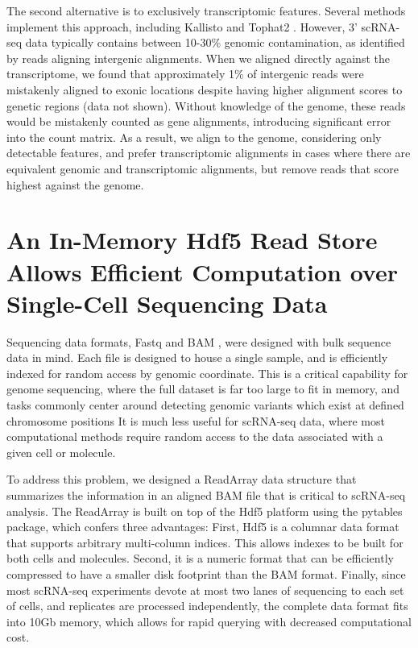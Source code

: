 The second alternative is to exclusively transcriptomic features. 
Several methods implement this approach, including Kallisto \citep{Bray2016} and Tophat2 \citep{Kim2013}. 
However, 3' scRNA-seq data typically contains between 10-30\% genomic contamination, as identified by reads aligning intergenic alignments. 
When we aligned directly against the transcriptome, we found that approximately 1\% of intergenic reads were mistakenly aligned to exonic locations despite having higher alignment scores to genetic regions (data not shown). 
Without knowledge of the genome, these reads would be mistakenly counted as gene alignments, introducing significant error into the count matrix. 
As a result, we align to the genome, considering only detectable features, and prefer transcriptomic alignments in cases where there are equivalent genomic and transcriptomic alignments, but remove reads that score highest against the genome.

\section{An In-Memory Hdf5 Read Store Allows Efficient Computation over Single-Cell Sequencing Data} 

Sequencing data formats, Fastq \citep{Cock2009} and BAM \citep{Li2009}, were designed with bulk sequence data in mind.
Each file is designed to house a single sample, and is efficiently indexed for random access by genomic coordinate. 
This is a critical capability for genome sequencing, where the full dataset is far too large to fit in memory, and tasks commonly center around detecting genomic variants which exist at defined chromosome positions \citep{McKenna2010}
It is much less useful for scRNA-seq data, where most computational methods require random access to the data associated with a given cell or molecule. 

To address this problem, we designed a ReadArray data structure that summarizes the information in an aligned BAM file that is critical to scRNA-seq analysis. 
The ReadArray is built on top of the {\mono Hdf5} platform \citep{HDFGroup1997-2017} using the {\mono pytables} package, which confers three advantages: 
First, Hdf5 is a columnar data format that supports arbitrary multi-column indices. 
This allows indexes to be built for both cells and molecules. 
Second, it is a numeric format that can be efficiently compressed \citep{Alted2010} to have a smaller disk footprint than the BAM format. 
Finally, since most scRNA-seq experiments devote at most two lanes of sequencing to each set of cells, and replicates are processed independently, the complete data format fits into 10Gb memory, which allows for rapid querying with decreased computational cost. 

